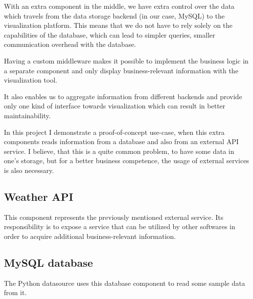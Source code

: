 With an extra component in the middle, we have extra control over the data which travels from the data storage backend (in our case, MySQL) to the visualization platform. This means that we do not have to rely solely on the capabilities of the database, which can lead to simpler queries, smaller communication overhead with the database.

Having a custom middleware makes it possible to implement the business logic in a separate component and only display business-relevant information with the visualization tool.

It also enables us to aggregate information from different backends and provide only one kind of interface towards visualization which can result in better maintainability.

In this project I demonstrate a proof-of-concept use-case, when this extra components reads information from a database and also from an external API service. I believe, that this is a quite common problem, to have some data in one's storage, but for a better business competence, the usage of external services is also necessary.

\subsection{Weather API}

This component represents the previously mentioned external service. Its responsibility is to expose a service that can be utilized by other softwares in order to acquire additional business-relevant information.

\subsection{MySQL database}

The Python datasource uses this database component to read some sample data from it.




